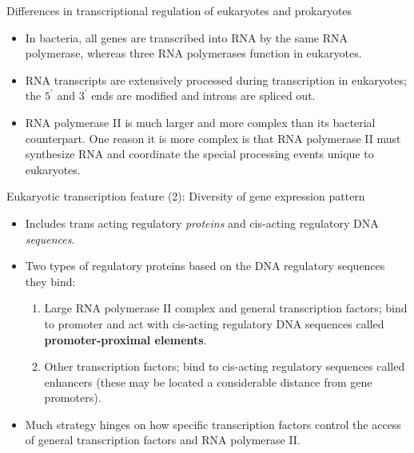 \documentclass[11pt,dvipsnames,ignorenonframetext,aspectratio=169]{beamer}
\providecommand{\tightlist}{%
  \setlength{\itemsep}{0pt}\setlength{\parskip}{0pt}}
\begin{document}
\begin{frame}{Differences in transcriptional regulation of eukaryotes
and prokaryotes}
\protect\hypertarget{differences-in-transcriptional-regulation-of-eukaryotes-and-prokaryotes}{}
\begin{itemize}
\tightlist
\item
  In bacteria, all genes are transcribed into RNA by the same RNA
  polymerase, whereas three RNA polymerases function in eukaryotes.
\item
  RNA transcripts are extensively processed during transcription in
  eukaryotes; the \(5^\prime\) and \(3^\prime\) ends are modified and
  introns are spliced out.
\item
  RNA polymerase II is much larger and more complex than its bacterial
  counterpart. One reason it is more complex is that RNA polymerase II
  must synthesize RNA and coordinate the special processing events
  unique to eukaryotes.
\end{itemize}
\end{frame}

\begin{frame}{Eukaryotic transcription feature (2): Diversity of gene
expression pattern}
\protect\hypertarget{eukaryotic-transcription-feature-2-diversity-of-gene-expression-pattern}{}
\begin{itemize}
\tightlist
\item
  Includes trans acting regulatory \emph{proteins} and cis-acting
  regulatory DNA \emph{sequences}.
\item
  Two types of regulatory proteins based on the DNA regulatory sequences
  they bind:

  \begin{enumerate}
  \tightlist
  \item
    Large RNA polymerase II complex and general transcription factors;
    bind to promoter and act with cis-acting regulatory DNA sequences
    called \textbf{promoter-proximal elements}.
  \item
    Other transcription factors; bind to cis-acting regulatory sequences
    called enhancers (these may be located a considerable distance from
    gene promoters).
  \end{enumerate}
\item
  Much strategy hinges on how specific transcription factors control the
  access of general transcription factors and RNA polymerase II.
\end{itemize}
\end{frame}
\end{document}

